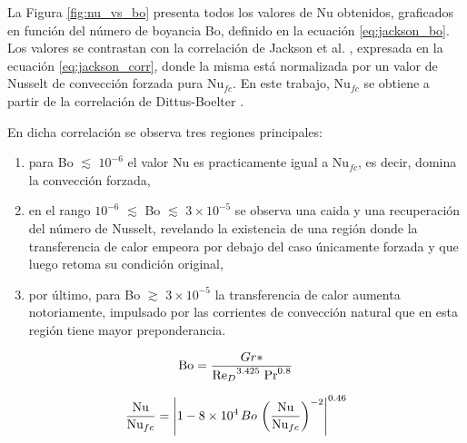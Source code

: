 La Figura \ref{fig:nu_vs_bo} presenta todos los valores de Nu obtenidos, graficados en función del número de boyancia Bo, definido en la ecuación \ref{eq:jackson_bo}. Los valores se contrastan con la correlación de Jackson et al. \cite{jackson1989studies}, expresada en la ecuación \ref{eq:jackson_corr}, donde la misma está normalizada por un valor de Nusselt de convección forzada pura Nu$_{fc}$. En este trabajo, Nu$_{fc}$ se obtiene a partir de la correlación de Dittus-Boelter \cite{incropera}. 

En dicha correlación se observa tres regiones principales:

\begin{enumerate}

\item para Bo $\lesssim$ $10^{-6}$ el valor Nu es practicamente igual a Nu$_{fc}$, es decir, domina la convección forzada,

\item en el rango $10^{-6}$ $\lesssim$ Bo $\lesssim$ $3 \times 10^{-5}$ se observa una caida y una recuperación del número de Nusselt, revelando la existencia de una región donde la transferencia de calor empeora por debajo del caso únicamente forzada y que luego retoma su condición original,

\item por último, para Bo $\gtrsim$ $3 \times 10^{-5}$ la transferencia de calor aumenta notoriamente, impulsado por las corrientes de convección natural que en esta región tiene mayor preponderancia.
\end{enumerate}

\begin{equation}
\text{Bo}= \frac{Gr*}{{\text{Re}_D}^{3.425} \hspace*{1mm} \text{Pr}^{0.8} }
\label{eq:jackson_bo}
\end{equation}

\begin{equation}
\frac{\text{Nu}}{\text{Nu}_{fc}}= \left\vert  1 - 8 \times 10^4 \hspace*{0.5mm} Bo \hspace*{0.5mm} \left( \frac{\text{Nu}}{\text{Nu}_{fc}} \right)^{-2}  \right\vert^{0.46}
\label{eq:jackson_corr} 
\end{equation}



